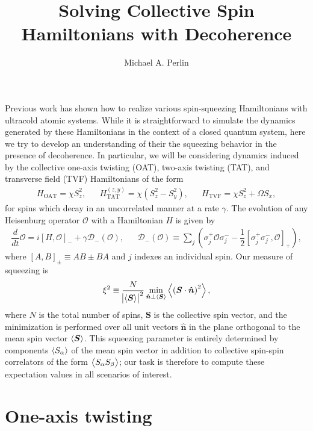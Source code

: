 \documentclass[aps,notitlepage,nofootinbib,11pt]{revtex4-1}
\renewcommand{\t}{\text} %
\newcommand{\f}[2]{\dfrac{#1}{#2}} %
\newcommand{\p}[1]{\left(#1\right)} %
\renewcommand{\sp}[1]{\left[#1\right]} %
\renewcommand{\v}{\bm} %
\newcommand{\uv}[1]{\v{\hat{#1}}} %
\renewcommand{\c}{\cdot} %
\newcommand{\bk}{\Braket} %
\newcommand{\D}{\mathcal{D}}
\renewcommand{\O}{\mathcal{O}}
\newcommand{\1}{\mathds{1}}
\begin{document}
\title{Solving Collective Spin Hamiltonians with Decoherence}

\author{Michael A. Perlin}

\maketitle

Previous work has shown how to realize various spin-squeezing
Hamiltonians with ultracold atomic systems.  While it is
straightforward to simulate the dynamics generated by these
Hamiltonians in the context of a closed quantum system, here we try to
develop an understanding of their the squeezing behavior in the
presence of decoherence.  In particular, we will be considering
dynamics induced by the collective one-axis twisting (OAT), two-axis
twisting (TAT), and transverse field (TVF) Hamiltonians of the form
\begin{align}
  H_{\t{OAT}} = \chi S_z^2,
  &&
  H_{\t{TAT}}^{\p{z,y}} = \chi \p{S_z^2 - S_y^2},
  &&
  H_{\t{TVF}} = \chi S_z^2 + \Omega S_x,
\end{align}
for spins which decay in an uncorrelated manner at a rate $\gamma$.
The evolution of any Heisenburg operator $\O$ with a Hamiltonian $H$
is given by
\begin{align}
  \f{d}{dt} \O
  = i\sp{H,\O}_- + \gamma\D_-\p{\O},
  &&
  \D_-\p{\O} \equiv \sum_j\p{\sigma_j^+\O\sigma_j^-
    - \f12\sp{\sigma_j^+\sigma_j^-,\O}_+},
  \label{eq:EOM}
\end{align}
where $\sp{A,B}_\pm\equiv AB\pm BA$ and $j$ indexes an individual
spin.  Our measure of squeezing is
\begin{align}
  \xi^2 \equiv \f{N}{\abs{\bk{\v S}}^2}
  \min_{\uv n\perp\bk{\v S}} \bk{\p{\v S\c\uv n}^2},
  \label{eq:squeezing}
\end{align}
where $N$ is the total number of spins, $\v S$ is the collective spin
vector, and the minimization is performed over all unit vectors
$\uv n$ in the plane orthogonal to the mean spin vector $\bk{\v S}$.
This squeezing parameter is entirely determined by components
$\bk{S_\alpha}$ of the mean spin vector in addition to collective
spin-spin correlators of the form $\bk{S_\alpha S_\beta}$; our task is
therefore to compute these expectation values in all scenarios of
interest.


\section{One-axis twisting}
\end{document}
